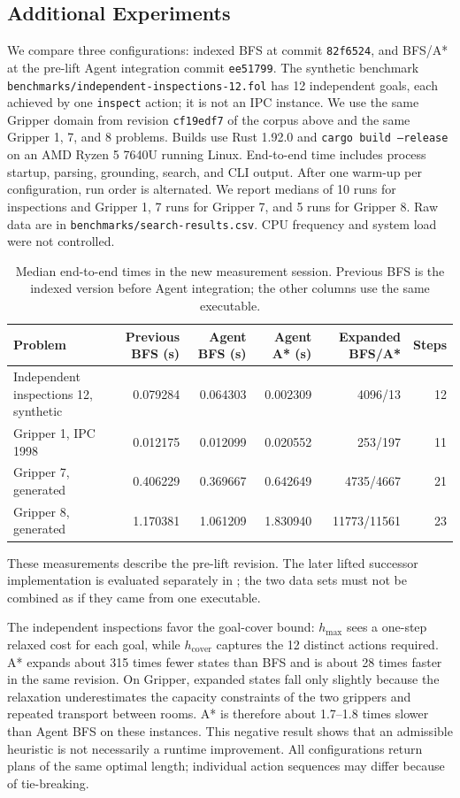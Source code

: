 \documentclass[10pt,a4paper]{article}
\begin{document}
\subsection{Additional Experiments}
We compare three configurations: indexed BFS at commit \texttt{82f6524}, and
BFS/A* at the pre-lift Agent integration commit \texttt{ee51799}. The
synthetic benchmark \texttt{benchmarks/independent-inspections-12.fol} has 12
independent goals, each achieved by one \texttt{inspect} action; it is not an
IPC instance. We use the same Gripper domain from revision \texttt{cf19edf7}
of the corpus above and the same Gripper 1, 7, and 8 problems. Builds use Rust
1.92.0 and \texttt{cargo build --release} on an AMD Ryzen 5 7640U running
Linux. End-to-end time includes process startup, parsing, grounding, search,
and CLI output. After one warm-up per configuration, run order is alternated.
We report medians of 10 runs for inspections and Gripper 1, 7 runs for Gripper
7, and 5 runs for Gripper 8. Raw data are in
\texttt{benchmarks/search-results.csv}. CPU frequency and system load were not
controlled.

\begin{table}[h]
\centering
\small
\begin{tabular}{lrrrrr}
\toprule
Problem & Previous BFS (s) & Agent BFS (s) & Agent A* (s) &
  Expanded BFS/A* & Steps \\
\midrule
Independent inspections 12, synthetic & 0.079284 & 0.064303 & 0.002309 & 4096/13 & 12 \\
Gripper 1, IPC 1998 & 0.012175 & 0.012099 & 0.020552 & 253/197 & 11 \\
Gripper 7, generated & 0.406229 & 0.369667 & 0.642649 & 4735/4667 & 21 \\
Gripper 8, generated & 1.170381 & 1.061209 & 1.830940 & 11773/11561 & 23 \\
\bottomrule
\end{tabular}
\caption{Median end-to-end times in the new measurement session. Previous BFS
is the indexed version before Agent integration; the other columns use the
same executable.}
\label{tab:heuristic}
\end{table}

These measurements describe the pre-lift revision. The later lifted
successor implementation is evaluated separately in
; the two data sets must not be
combined as if they came from one executable.

The independent inspections favor the goal-cover bound: $h_{\max}$ sees a
one-step relaxed cost for each goal, while $h_{\mathrm{cover}}$ captures the
12 distinct actions required. A* expands about 315 times fewer states than
BFS and is about 28 times faster in the same revision. On Gripper, expanded
states fall only slightly because the relaxation underestimates the capacity
constraints of the two grippers and repeated transport between rooms. A* is
therefore about 1.7--1.8 times slower than Agent BFS on these instances. This
negative result shows that an admissible heuristic is not necessarily a runtime
improvement. All configurations return plans of the same optimal length;
individual action sequences may differ because of tie-breaking.
\end{document}
